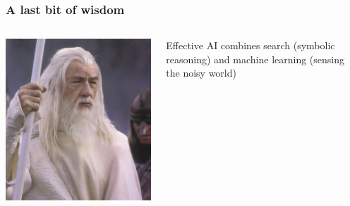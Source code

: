 \documentclass[usenames,dvipsnames]{beamer}
\begin{document}
\begin{frame}[c]\frametitle{A last bit of wisdom}
	\begin{columns}
		\begin{column}{.3\textwidth}
			\includegraphics[width=\textwidth]{fig/gandalf-wisdom.jpg}
		\end{column}
		\begin{column}{.7\textwidth}
			\begin{center}
				Effective AI combines search (symbolic reasoning) and machine learning (sensing the noisy world)
				
				\vspace*{2em}
				
			\end{center}
		\end{column}
	\end{columns}
\end{frame}
\end{document}
